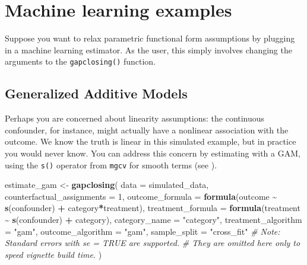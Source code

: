 \documentclass[
]{article}
\newenvironment{Shaded}{\begin{snugshade}}{\end{snugshade}}
\newcommand{\AttributeTok}[1]{\textcolor[rgb]{0.13,0.29,0.53}{#1}}
\newcommand{\CommentTok}[1]{\textcolor[rgb]{0.56,0.35,0.01}{\textit{#1}}}
\newcommand{\DecValTok}[1]{\textcolor[rgb]{0.00,0.00,0.81}{#1}}
\newcommand{\FunctionTok}[1]{\textcolor[rgb]{0.13,0.29,0.53}{\textbf{#1}}}
\newcommand{\NormalTok}[1]{#1}
\newcommand{\OtherTok}[1]{\textcolor[rgb]{0.56,0.35,0.01}{#1}}
\newcommand{\SpecialCharTok}[1]{\textcolor[rgb]{0.81,0.36,0.00}{\textbf{#1}}}
\newcommand{\StringTok}[1]{\textcolor[rgb]{0.31,0.60,0.02}{#1}}
\begin{document}
\section{Machine learning examples}\label{machine-learning-examples}

Suppose you want to relax parametric functional form assumptions by plugging in a machine learning estimator. As the user, this simply involves changing the arguments to the \texttt{gapclosing()} function.

\subsection{Generalized Additive Models}\label{generalized-additive-models}

Perhaps you are concerned about linearity assumptions: the continuous confounder, for instance, might actually have a nonlinear association with the outcome. We know the truth is linear in this simulated example, but in practice you would never know. You can address this concern by estimating with a GAM, using the \texttt{s()} operator from \texttt{mgcv} for smooth terms (see \citet{mgcv}).

\begin{Shaded}
\begin{Highlighting}[]
\NormalTok{estimate\_gam }\OtherTok{\textless{}{-}} \FunctionTok{gapclosing}\NormalTok{(}
  \AttributeTok{data =}\NormalTok{ simulated\_data,}
  \AttributeTok{counterfactual\_assignments =} \DecValTok{1}\NormalTok{,}
  \AttributeTok{outcome\_formula =} \FunctionTok{formula}\NormalTok{(outcome }\SpecialCharTok{\textasciitilde{}} \FunctionTok{s}\NormalTok{(confounder) }\SpecialCharTok{+}\NormalTok{ category}\SpecialCharTok{*}\NormalTok{treatment),}
  \AttributeTok{treatment\_formula =} \FunctionTok{formula}\NormalTok{(treatment }\SpecialCharTok{\textasciitilde{}} \FunctionTok{s}\NormalTok{(confounder) }\SpecialCharTok{+}\NormalTok{ category),}
  \AttributeTok{category\_name =} \StringTok{"category"}\NormalTok{,}
  \AttributeTok{treatment\_algorithm =} \StringTok{"gam"}\NormalTok{,}
  \AttributeTok{outcome\_algorithm =} \StringTok{"gam"}\NormalTok{,}
  \AttributeTok{sample\_split =} \StringTok{"cross\_fit"}
  \CommentTok{\# Note: Standard errors with \textasciigrave{}se = TRUE\textasciigrave{} are supported.}
  \CommentTok{\# They are omitted here only to speed vignette build time.}
\NormalTok{)}
\end{Highlighting}
\end{Shaded}
\end{document}

